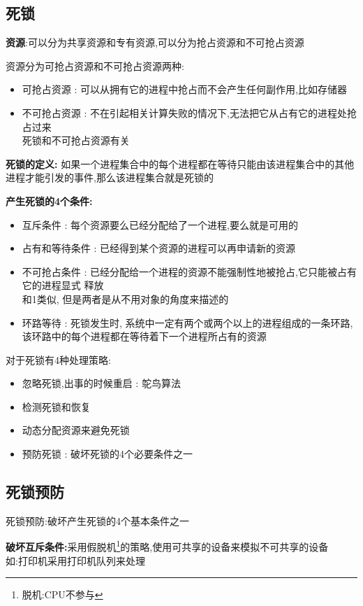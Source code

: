 \documentclass[UTF8,a4paper]{ctexart}
\begin{document}
\subsection{死锁}
\textbf{资源}:可以分为共享资源和专有资源,可以分为抢占资源和不可抢占资源

资源分为可抢占资源和不可抢占资源两种:
\begin{itemize}
	\item 可抢占资源 : 可以从拥有它的进程中抢占而不会产生任何副作用,比如存储器
	\item 不可抢占资源 : 不在引起相关计算失败的情况下,无法把它从占有它的进程处抢占过来\\死锁和不可抢占资源有关
\end{itemize}

\textbf{死锁的定义:}  如果一个进程集合中的每个进程都在等待只能由该进程集合中的其他进程才能引发的事件,那么该进程集合就是死锁的

\textbf{产生死锁的4个条件:}
\begin{itemize}
	\item 互斥条件 : 每个资源要么已经分配给了一个进程,要么就是可用的
	\item 占有和等待条件 : 已经得到某个资源的进程可以再申请新的资源
	\item 不可抢占条件 : 已经分配给一个进程的资源不能强制性地被抢占,它只能被占有它的进程显式 释放\\和1类似, 但是两者是从不用对象的角度来描述的
	\item 环路等待 : 死锁发生时, 系统中一定有两个或两个以上的进程组成的一条环路,该环路中的每个进程都在等待着下一个进程所占有的资源
\end{itemize}

对于死锁有4种处理策略:
\begin{itemize}
	\item 忽略死锁,出事的时候重启 : 鸵鸟算法
	\item 检测死锁和恢复
	\item 动态分配资源来避免死锁
	\item 预防死锁 : 破坏死锁的4个必要条件之一
\end{itemize}

\subsection{死锁预防}
死锁预防:破坏产生死锁的4个基本条件之一

\textbf{破坏互斥条件:}采用假脱机\footnote{脱机:CPU不参与}的策略,使用可共享的设备来模拟不可共享的设备\\
如:打印机采用打印机队列来处理
\end{document}
